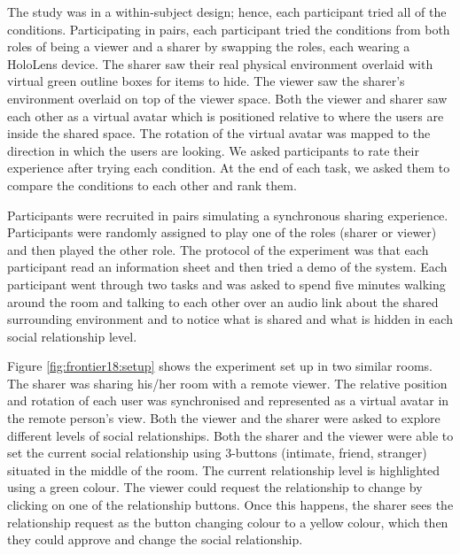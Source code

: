 The study was in a within-subject design; hence, each participant tried all of the conditions. Participating in pairs, each participant tried the conditions from both roles of being a viewer and a sharer by swapping the roles, each wearing a HoloLens device. The sharer saw their real physical environment overlaid with virtual green outline boxes for items to hide. The viewer saw the sharer's environment overlaid on top of the viewer space. Both the viewer and sharer saw each other as a virtual avatar which is positioned relative to where the users are inside the shared space. The rotation of the virtual avatar was mapped to the direction in which the users are looking. We asked participants to rate their experience after trying each condition. At the end of each task, we asked them to compare the conditions to each other and rank them. 


Participants were recruited in pairs simulating a synchronous sharing experience. Participants were randomly assigned to play one of the roles (sharer or viewer) and then played the other role. The protocol of the experiment was that each participant read an information sheet and then tried a demo of the system. Each participant went through two tasks and was asked to spend five minutes walking around the room and talking to each other over an audio link about the shared surrounding environment and to notice what is shared and what is hidden in each social relationship level. 

Figure \ref{fig:frontier18:setup} shows the experiment set up in two similar rooms. The sharer was sharing his/her room with a remote viewer. The relative position and rotation of each user was synchronised and represented as a virtual avatar in the remote person's view. 
Both the viewer and the sharer were asked to explore different levels of social relationships. Both the sharer and the viewer were able to set the current social relationship using 3-buttons (intimate, friend, stranger) situated in the middle of the room. The current relationship level is highlighted using a green colour. The viewer could request the relationship to change by clicking on one of the relationship buttons. Once this happens, the sharer sees the relationship request as the button changing colour to a yellow colour, which then they could approve and change the social relationship.

